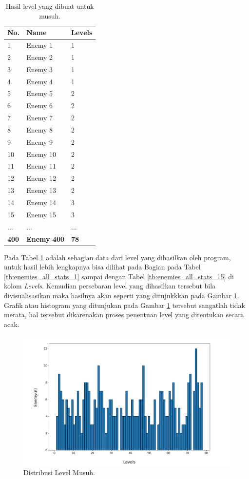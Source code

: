 \begin{longtable}{|l|l|l|}
	\caption{Hasil level yang dibuat untuk musuh.}
	\label{tb:enemy_level_distrib}\\
	\hline
	\rowcolor[HTML]{C0C0C0} 
	\textbf{No.} & \textbf{Name} & \textbf{Levels} \\ \hline
	1 & Enemy 1 & 1 \\ \hline
	2 & Enemy 2 & 1 \\ \hline
	3 & Enemy 3 & 1 \\ \hline
	4 & Enemy 4 & 1 \\ \hline
	5 & Enemy 5 & 2 \\ \hline
	6 & Enemy 6 & 2 \\ \hline
	7 & Enemy 7 & 2 \\ \hline
	8 & Enemy 8 & 2 \\ \hline
	9 & Enemy 9 & 2 \\ \hline
	10 & Enemy 10 & 2 \\ \hline
	11 & Enemy 11 & 2 \\ \hline
	12 & Enemy 12 & 2 \\ \hline
	13 & Enemy 13 & 2 \\ \hline
	14 & Enemy 14 & 3 \\ \hline
	15 & Enemy 15 & 3 \\ \hline
	... & ... & ... \\ \hline
	\textbf{400} & \textbf{Enemy 400} & \textbf{78} \\ \hline
\end{longtable}

Pada Tabel \ref{tb:enemy_level_distrib} adalah sebagian data dari level yang dihasilkan oleh program, untuk hasil lebih lengkapnya bisa dilihat pada Bagian  pada Tabel \ref{tb:enemies_all_stats_1} sampai dengan Tabel \ref{tb:enemies_all_stats_15} di kolom \textit{Levels}. Kemudian persebaran level yang dihasilkan tersebut bila divisualisasikan maka hasilnya akan seperti yang ditujukkkan pada Gambar \ref{fig:enemy_level_distrib}. Grafik atau histogram yang ditunjukan pada Gambar \ref{fig:enemy_level_distrib} tersebut sangatlah tidak merata, hal tersebut dikarenakan proses penentuan level yang ditentukan secara acak.

\begin{figure} [!h] \centering
	\includegraphics[scale=0.48]{img/EnemyLevelDistrib.png}
	\caption{Distribusi Level Musuh.}
	\label{fig:enemy_level_distrib}
\end{figure}

